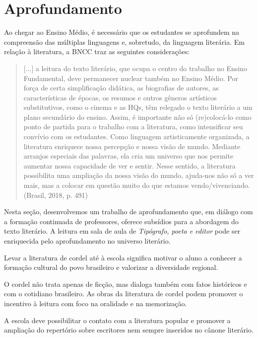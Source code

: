 \documentclass[12pt]{extarticle}
\begin{document}

\section{Aprofundamento}

Ao chegar ao Ensino Médio, é necessário que os estudantes se aprofundem
na compreensão das múltiplas linguagens e, sobretudo, da linguagem
literária. Em relação à literatura, a BNCC traz as seguintes
considerações:

\begin{quote}
{[}...{]} a leitura do texto literário, que ocupa o centro do trabalho
no Ensino Fundamental, deve permanecer nuclear também no Ensino Médio.
Por força de certa simplificação didática, as biografias de autores, as
características de épocas, os resumos e outros gêneros artísticos
substitutivos, como o cinema e as HQs, têm relegado o texto literário a
um plano secundário do ensino. Assim, é importante não só (re)colocá-lo
como ponto de partida para o trabalho com a literatura, como
intensificar seu convívio com os estudantes. Como linguagem
artisticamente organizada, a literatura enriquece nossa percepção e
nossa visão de mundo. Mediante arranjos especiais das palavras, ela cria
um universo que nos permite aumentar nossa capacidade de ver e sentir.
Nesse sentido, a literatura possibilita uma ampliação da nossa visão do
mundo, ajuda-nos não só a ver mais, mas a colocar em questão muito do
que estamos vendo/vivenciando. (Brasil, 2018, p. 491)
\end{quote}

Nesta seção, desenvolvemos um trabalho de aprofundamento que, em diálogo
com a formação continuada de professores, oferece subsídios para a
abordagem do texto literário. A leitura em sala de aula de
\emph{Tipógrafo, poeta e editor} pode ser enriquecida pelo aprofundamento no
universo literário.

Levar a literatura de cordel até à escola significa motivar o aluno a
conhecer a formação cultural do povo brasileiro e valorizar a
diversidade regional.

O cordel não trata apenas de ficção, mas dialoga também com fatos
históricos e com o cotidiano brasileiro. As obras da literatura de
cordel podem promover o incentivo à leitura com foco na oralidade e na
memorização.

A escola deve possibilitar o contato com a literatura popular e promover
a ampliação do repertório sobre escritores nem sempre inseridos no
cânone literário.
\end{document}
